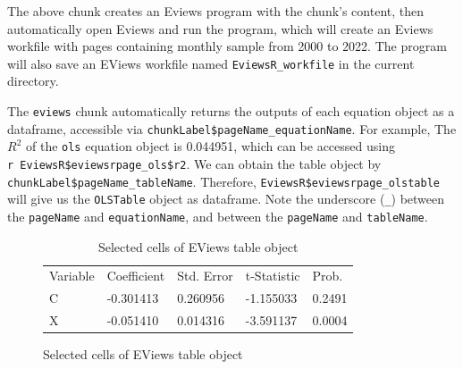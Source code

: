 \documentclass[
  letterpaper,
  DIV=11,
  numbers=noendperiod]{scrartcl}
\newenvironment{Shaded}{\begin{snugshade}}{\end{snugshade}}
\newcommand{\AttributeTok}[1]{\textcolor[rgb]{0.40,0.45,0.13}{#1}}
\newcommand{\CommentTok}[1]{\textcolor[rgb]{0.37,0.37,0.37}{#1}}
\newcommand{\ConstantTok}[1]{\textcolor[rgb]{0.56,0.35,0.01}{#1}}
\newcommand{\DecValTok}[1]{\textcolor[rgb]{0.68,0.00,0.00}{#1}}
\newcommand{\FunctionTok}[1]{\textcolor[rgb]{0.28,0.35,0.67}{#1}}
\newcommand{\NormalTok}[1]{\textcolor[rgb]{0.00,0.23,0.31}{#1}}
\newcommand{\OtherTok}[1]{\textcolor[rgb]{0.00,0.23,0.31}{#1}}
\newcommand{\SpecialCharTok}[1]{\textcolor[rgb]{0.37,0.37,0.37}{#1}}
\newcommand{\StringTok}[1]{\textcolor[rgb]{0.13,0.47,0.30}{#1}}
\begin{document}
The above chunk creates an Eviews program with the chunk's content, then
automatically open Eviews and run the program, which will create an
Eviews workfile with pages containing monthly sample from 2000 to 2022.
The program will also save an EViews workfile named
\texttt{EviewsR\_workfile} in the current directory.

The \texttt{eviews} chunk automatically returns the outputs of each
equation object as a dataframe, accessible via
\texttt{chunkLabel\$pageName\_equationName}. For example, The \(R^2\) of
the \texttt{ols} equation object is 0.044951, which can be accessed
using
\texttt{\textasciigrave{}r\ EviewsR\$eviewsrpage\_ols\$r2\textasciigrave{}}.
We can obtain the table object by
\texttt{chunkLabel\$pageName\_tableName}. Therefore,
\texttt{EviewsR\$eviewsrpage\_olstable} will give us the
\texttt{OLSTable} object as dataframe. Note the underscore (\texttt{\_})
between the \texttt{pageName} and \texttt{equationName}, and between the
\texttt{pageName} and \texttt{tableName}.

\begin{Shaded}
\end{Shaded}

\begin{figure}

\begin{minipage}[t]{0.50\linewidth}

{\centering 

\begin{longtable}[]{@{}lllll@{}}
\caption{Selected cells of EViews table object}\tabularnewline
\toprule()
\endhead
Variable & Coefficient & Std. Error & t-Statistic & Prob. \\
C & -0.301413 & 0.260956 & -1.155033 & 0.2491 \\
X & -0.051410 & 0.014316 & -3.591137 & 0.0004 \\
\bottomrule()
\end{longtable}

}

\end{minipage}%

\end{figure}
\end{document}
